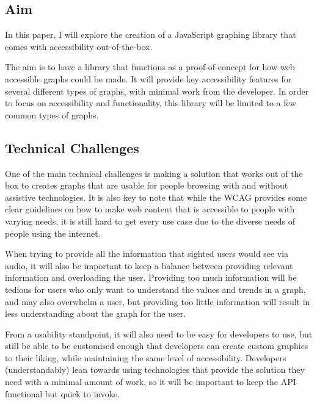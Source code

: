 \documentclass[ %
                    author={Aleena Baig},
                supervisor={Dr Simon Lock},
                    degree={BSc},
                     title={On Making Web Accessible Graphs},
                  subtitle={},
                      year={2019} ]{dissertation}
\begin{document}
\subsection{Aim}

In this paper, I will explore the creation of a JavaScript graphing library that comes with accessibility out-of-the-box.

The aim is to have a library that functions as a proof-of-concept for how web accessible graphs could be made. It will provide key accessibility features for several different types of graphs, with minimal work from the developer. In order to focus on accessibility and functionality, this library will be limited to a few common types of graphs.

\subsection{Technical Challenges}

One of the main technical challenges is making a solution that works out of the box to creates graphs that are usable for people browsing with and without assistive technologies. It is also key to note that while the WCAG provides some clear guidelines on how to make web content that is accessible to people with varying needs, it is still hard to get every use case due to the diverse needs of people using the internet.

When trying to provide all the information that sighted users would see via audio, it will also be important to keep a balance between providing relevant information and overloading the user. Providing too much information will be tedious for users who only want to understand the values and trends in a graph, and may also overwhelm a user, but providing too little information will result in less understanding about the graph for the user.

From a usability standpoint, it will also need to be easy for developers to use, but still be able to be customised enough that developers can create custom graphics to their liking, while maintaining the same level of accessibility. Developers (understandably) lean towards using technologies that provide the solution they need with a minimal amount of work, so it will be important to keep the API functional but quick to invoke.

\end{document}
